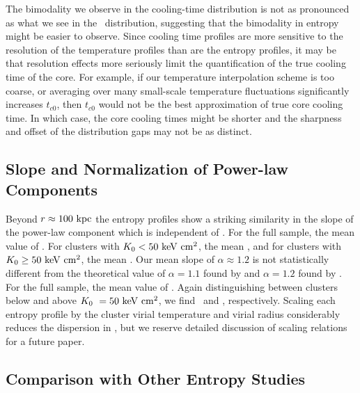 \documentclass[12pt,preprint]{aastex}
\begin{document}
The bimodality we observe in the cooling-time distribution is not as
pronounced as what we see in the \kna\ distribution, suggesting that
the bimodality in entropy might be easier to observe. Since cooling
time profiles are more sensitive to the resolution of the temperature
profiles than are the entropy profiles, it may be that resolution
effects more seriously limit the quantification of the true cooling
time of the core. For example, if our temperature interpolation scheme
is too coarse, or averaging over many small-scale temperature
fluctuations significantly increases $t_{c0}$, then $t_{c0}$ would not
be the best approximation of true core cooling time. In which case,
the core cooling times might be shorter and the sharpness and offset
of the distribution gaps may not be as distinct.

\subsection{Slope and Normalization of Power-law Components}
\label{sec:slopes}

Beyond $r \approx 100 \mbox{\ensuremath{\mathrm{~kpc}}}$ the entropy profiles show a striking
similarity in the slope of the power-law component which is
independent of \kna. For the full sample, the mean value of
\alphafs. For clusters with $K_0 < 50 \mathrm{\mbox{\ensuremath{\mathrm{~keV}}} \mathrm{\mbox{\ensuremath{\mathrm{~cm}}}^2}}$, the mean
\alphaga, and for clusters with $K_0 \geq 50 \mathrm{\mbox{\ensuremath{\mathrm{~keV}}} \mathrm{\mbox{\ensuremath{\mathrm{~cm}}}^2}}$, the mean
\alphagb. Our mean slope of $\alpha \approx 1.2$ is not statistically
different from the theoretical value of $\alpha = 1.1$ found by
\citet{tozzi01} and $\alpha = 1.2$ found by \citet{vkb05}. For the
full sample, the mean value of \khunfs. Again distinguishing between
clusters below and above $K_0\ = 50 \mathrm{\mbox{\ensuremath{\mathrm{~keV}}} \mathrm{\mbox{\ensuremath{\mathrm{~cm}}}^2}}$, we find \khunga\ and
\khungb, respectively. Scaling each entropy profile by the cluster
virial temperature and virial radius considerably reduces the
dispersion in \khun, but we reserve detailed discussion of scaling
relations for a future paper.

\subsection{Comparison with Other Entropy Studies}
\label{sec:comp}
\end{document}
